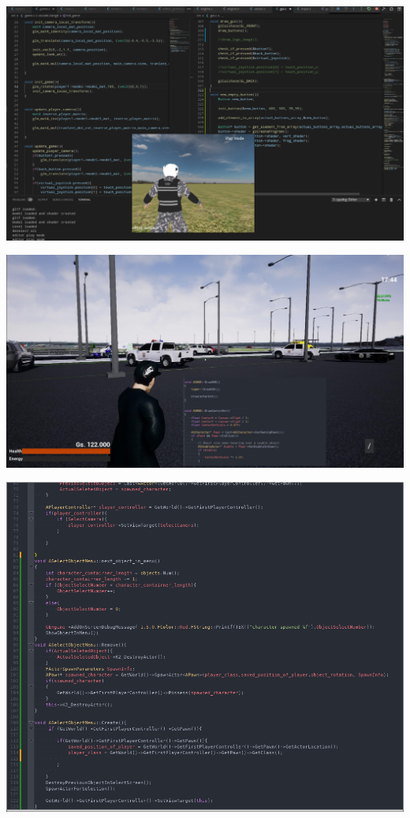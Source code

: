 \documentclass{article}
\begin{document}
  \includegraphics[width=\textwidth]{48.png}

  \includegraphics[width=\textwidth]{49.jpg}

  \includegraphics[width=\textwidth]{50.png}
\end{document}
